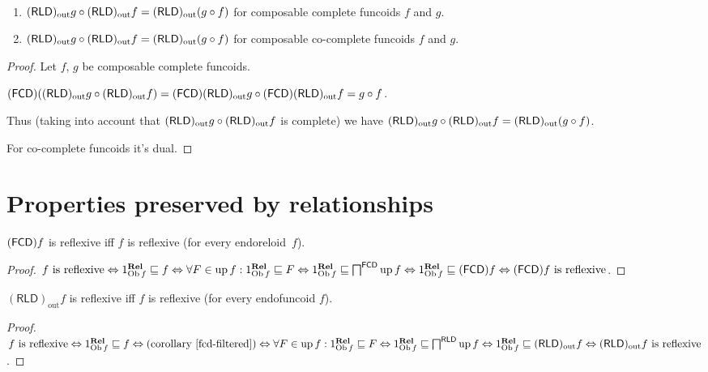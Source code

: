 \begin{thm}
~
\begin{enumerate}
\item $(\mathsf{RLD})_{\mathrm{out}} g\circ(\mathsf{RLD})_{\mathrm{out}} f=(\mathsf{RLD})_{\mathrm{out}}(g\circ f)$ for composable
complete funcoids $f$ and $g$.
\item $(\mathsf{RLD})_{\mathrm{out}} g\circ(\mathsf{RLD})_{\mathrm{out}} f=(\mathsf{RLD})_{\mathrm{out}}(g\circ f)$ for composable
co-complete funcoids $f$ and $g$.
\end{enumerate}
\end{thm}
\begin{proof}
Let $f$, $g$ be composable complete funcoids.

$(\mathsf{FCD})((\mathsf{RLD})_{\mathrm{out}} g\circ(\mathsf{RLD})_{\mathrm{out}} f)=(\mathsf{FCD})(\mathsf{RLD})_{\mathrm{out}} g\circ(\mathsf{FCD})(\mathsf{RLD})_{\mathrm{out}} f=g\circ f$.

Thus (taking into account that $(\mathsf{RLD})_{\mathrm{out}} g\circ(\mathsf{RLD})_{\mathrm{out}} f$ is complete)
we have $(\mathsf{RLD})_{\mathrm{out}} g\circ(\mathsf{RLD})_{\mathrm{out}} f=(\mathsf{RLD})_{\mathrm{out}}(g\circ f)$.

For co-complete funcoids it's dual.\end{proof}

\section{Properties preserved by relationships}

\begin{prop}
  $(\mathsf{FCD}) f$ is reflexive iff $f$ is reflexive (for every
  endoreloid~$f$).
\end{prop}

\begin{proof}
  $\text{$f$ is reflexive} \Leftrightarrow
  1^{\mathbf{Rel}}_{\operatorname{Ob} f} \sqsubseteq f \Leftrightarrow
  \forall F \in \operatorname{up} f : 1^{\mathbf{Rel}}_{\operatorname{Ob} f}
  \sqsubseteq F \Leftrightarrow 1^{\mathbf{Rel}}_{\operatorname{Ob} f}
  \sqsubseteq \bigsqcap^{\mathsf{FCD}} \operatorname{up} f \Leftrightarrow
  1^{\mathbf{Rel}}_{\operatorname{Ob} f} \sqsubseteq (\mathsf{FCD}) f
  \Leftrightarrow \text{$(\mathsf{FCD}) f$ is reflexive}$.
\end{proof}

\begin{prop}
  $(\mathsf{RLD})_{\operatorname{out}} f$ is reflexive iff $f$ is reflexive
  (for every endofuncoid $f$).
\end{prop}

\begin{proof}
  $\text{$f$ is reflexive} \Leftrightarrow
  1^{\mathbf{Rel}}_{\operatorname{Ob} f} \sqsubseteq f \Leftrightarrow
  \text{(corollary~\ref{fcd-filtered})} \Leftrightarrow \forall F \in \operatorname{up} f :
  1^{\mathbf{Rel}}_{\operatorname{Ob} f} \sqsubseteq F \Leftrightarrow
  1^{\mathbf{Rel}}_{\operatorname{Ob} f} \sqsubseteq
  \bigsqcap^{\mathsf{RLD}} \operatorname{up} f \Leftrightarrow
  1^{\mathbf{Rel}}_{\operatorname{Ob} f} \sqsubseteq
  (\mathsf{RLD})_{\operatorname{out}} f \Leftrightarrow
  \text{$(\mathsf{RLD})_{\operatorname{out}} f$ is reflexive}$.
\end{proof}

